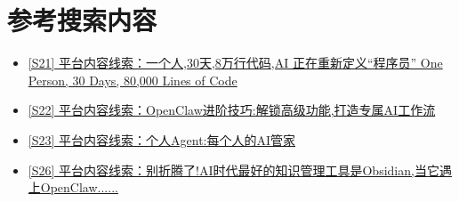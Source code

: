 \documentclass[UTF8,zihao=-4]{ctexart}
\begin{document}
\section*{参考搜索内容}
\begin{itemize}[leftmargin=2em]
\item \href{https://weixin.sogou.com/link?url=dn9a_-gY295K0Rci_xozVXfdMkSQTLW6cwJThYulHEtVjXrGTiVgS2rVltFLkJqLNqZmVKQmZwEq7LeflhQuhlqXa8Fplpd9CNqIlk7-a31w5BGMbZJF9EWapIMqwvOQv4NfS0aoqp90KQY4bouZtCIpzpcV1GAG7Ql4aQy981DI5_YvU65Wx7RIuSm_DQfuJ5H8h-MVkM4zF-lDIEm_1jT-8S3aDcSjjU6ufcsvDgQAHvuE0UGbiTd-nik8UXzcRlmMxbHNciUNGbbB75bUeA..&type=2&query=%E4%B8%AA%E4%BA%BA%E7%9F%A5%E8%AF%86%E7%AE%A1%E7%90%86%20AI%20workflow%20daily%20review%20knowledge%20management&token=3302AF2C6CC021EDD6D084FB26161CAED7C4929C6A204099}{[S21] 平台内容线索：一个人,30天,8万行代码,AI 正在重新定义“程序员” One Person, 30 Days, 80,000 Lines of Code}
\item \href{https://weixin.sogou.com/link?url=dn9a_-gY295K0Rci_xozVXfdMkSQTLW6cwJThYulHEtVjXrGTiVgS2rVltFLkJqLNqZmVKQmZwEq7LeflhQuhlqXa8Fplpd9uxSsebPt2G7ep94XnrFS2k_9uY7KfpAsTzqzlXYH6vQplwzzrM-ORdXXjgCbrrDcsox8rcNKq7_v7VD3ZNujvMSYjOnUpDXGDDeFQknJRXQoffqNua40Wxxko2p21aFNE_aspAThVaouS2qAqPHSsR37Rzq79gMqffbho6K_iZC54z_tGSZTqA..&type=2&query=%E4%B8%AA%E4%BA%BA%E7%9F%A5%E8%AF%86%E7%AE%A1%E7%90%86%20AI%20workflow%20daily%20review%20knowledge%20management&token=3302AF2C6CC021EDD6D084FB26161CAED7C4929C6A204099}{[S22] 平台内容线索：OpenClaw进阶技巧:解锁高级功能,打造专属AI工作流}
\item \href{https://weixin.sogou.com/link?url=dn9a_-gY295K0Rci_xozVXfdMkSQTLW6cwJThYulHEtVjXrGTiVgS2rVltFLkJqLNqZmVKQmZwEq7LeflhQuhlqXa8Fplpd9Jw3AegiWpd_7i1FH5Q6oCDIyJiEVma1QCRGoNJZ7c4hzPh6efjLP5H_iU9oudjoCi1f9aQZAdR83YFhybZNmKwFA4WosuG1NV4TFy0A7RdMWAozpKiuzJEc9qqX-euP7Tenvyj6E9fF1paT3ZVDCOVxLVSuS1dUoBdM6q4BlJVOq3X8EKMKOIA..&type=2&query=%E4%B8%AA%E4%BA%BA%E7%9F%A5%E8%AF%86%E7%AE%A1%E7%90%86%20AI%20workflow%20daily%20review%20knowledge%20management&token=3302AF2C6CC021EDD6D084FB26161CAED7C4929C6A204099}{[S23] 平台内容线索：个人Agent:每个人的AI管家}
\item \href{https://weixin.sogou.com/link?url=dn9a_-gY295K0Rci_xozVXfdMkSQTLW6cwJThYulHEtVjXrGTiVgS2rVltFLkJqLc2r5uZgnqUUq7LeflhQuhlqXa8Fplpd9xCcLtzrpqFQwtgV_RHC7qw0VMshEKYdyhmt8unk7PkSLfR8dQBujFPJUor8I9uqFA6V0BMWrt-95ZtFgFLP6mJFVeIDBRK8cay1V58p5yJUkq0TVpsYO6rpFD1yHikgYZpq822fB2StT8A9fZNfQ7QEiuWMK898730cVnc-8v35hWLv6O878UA..&type=2&query=%E6%9C%AC%E5%9C%B0%20Markdown%20%E7%9F%A5%E8%AF%86%E5%BA%93%20%E4%B8%AA%E4%BA%BA%E7%9F%A5%E8%AF%86%E7%AE%A1%E7%90%86%20%E7%AC%94%E8%AE%B0%20%E5%B7%A5%E5%85%B7&token=3303835E6CC021EDD6D084FB26161CAED7C4929C6A2040BC}{[S26] 平台内容线索：别折腾了!AI时代最好的知识管理工具是Obsidian,当它遇上OpenClaw......}

\end{itemize}
\end{document}

